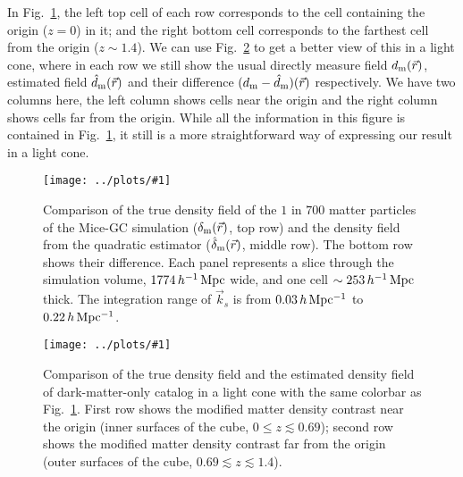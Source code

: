 \documentclass[prd,amsmath,amssymb,floatfix,superscriptaddress,nofootinbib,twocolumn]{revtex4-1}
\newcommand{\vrr}{\vec{r}}
\newcommand{\vk}{\vec{k}}
\newcommand{\rf}[1]{\ref{fig:#1}}
\newcommand{\sfig}[2]{
\texttt{[image: ../plots/\#1]}
        }
\newcommand{\Sfig}[2]{
   \begin{figure}[thbp]
   \begin{center}
    \sfig{../plots/#1.pdf}{\columnwidth}
    \caption{{\small #2}}
    \label{fig:#1}
     \end{center}
   \end{figure}
}
\begin{document}
In Fig.~\rf{real_dm}, the left top cell of each row corresponds to the cell containing the origin ($z=0$) in it; and the right bottom cell corresponds to the farthest cell from the origin ($z\sim 1.4$). We can use Fig.~\rf{cube_dm} to get a better view of this in a light cone, where in each row we still show the usual directly measure field $d_{\rm m}(\vrr)$, estimated field $\hat{d}_{\rm m}(\vrr)$ and their difference $(d_{\rm m}-\hat{d}_{\rm m})(\vrr)$ respectively. We have two columns here, the left column shows cells near the origin and the right column shows cells far from the origin. While all the information in this figure is contained in Fig.~\rf{real_dm}, it still is a more straightforward way of expressing our result in a light cone. 


\Sfig{real_dm}{Comparison of the true density field of the $1$ in $700$ matter particles of the Mice-GC simulation ($\delta_{\rm m}(\vrr)$, top row) and the density field from the quadratic estimator ($\hat{\delta}_{\rm m}(\vrr)$, middle row). The bottom row shows their difference. Each panel represents a slice through the simulation volume, $1774\,h^{-1}\rm \, Mpc$ wide, and one cell $\sim 253\,h^{-1}\rm \, Mpc$ thick. The integration range of $\vk_{s}$ is from $0.03\, h \rm \, Mpc^{-1}$ to $0.22\, h \rm \, Mpc^{-1}$.}
\Sfig{cube_dm}{Comparison of the true density field and the estimated density field of dark-matter-only catalog in a light cone with the same colorbar as Fig.~\rf{real_dm}. First row shows the modified matter density contrast near the origin (inner surfaces of the cube, $0\leqslant z \lesssim 0.69$); second row shows the modified matter density contrast far from the origin (outer surfaces of the cube, $0.69\lesssim z \lesssim 1.4$).}
\end{document}
